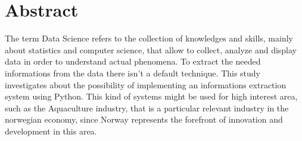 \clearpage 

\chapter{Abstract}

The term Data Science refers to the collection of knowledges and skills, mainly about statistics and computer science, that allow to collect, analyze and display data in order to understand actual phenomena. To extract the needed informations from the data there isn't a default technique. This study investigates about the possibility of implementing an informations extraction system using Python. This kind of systems might be used for high interest area, such as the Aquaculture industry, that is a particular relevant industry in the norwegian economy, since Norway represents the forefront of innovation and development in this area.
 



